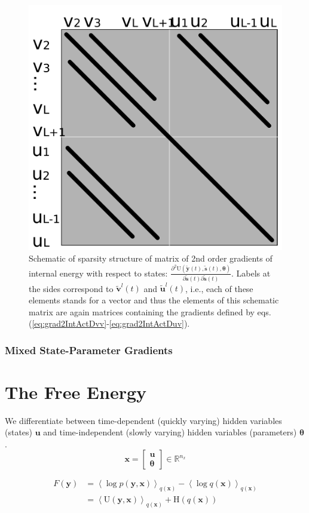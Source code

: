 \documentclass[a4paper,10pt]{article}
\newcommand{\bs}[1]{\mathbf{#1}}					%
\newcommand{\bgs}[1]{\boldsymbol{#1}}				%
\newcommand{\ppd}[3]{\frac{\partial^2 #1}{\partial #2 \partial #3}} %
\newcommand{\eq}[1]{\begin{equation} #1 \end{equation}}%
\newcommand{\gc}[1]{\tilde{#1}} %
\renewcommand{\ss}{u}         %
\newcommand{\sv}{v}         %
\newcommand{\so}{y}         %
\newcommand{\sh}{x}         %
\newcommand{\st}{s}         %
\renewcommand{\sp}{\theta}    %
\newcommand{\ps}{\bs{\ss}}    %
\newcommand{\pv}{\bs{\sv}}    %
\newcommand{\po}{\bs{\so}}    %
\newcommand{\ph}{\bs{\sh}}    %
\newcommand{\pt}{\bs{\st}}     %
\newcommand{\psg}{\gc{\ps}}    %
\newcommand{\pvg}{\gc{\pv}}    %
\newcommand{\ptg}{\gc{\pt}}     %
\newcommand{\pog}{\gc{\po}}    %
\newcommand{\pp}{\bgs{\sp}} %
\newcommand{\E}[2][]{\left\langle #2 \right\rangle_{#1}}	%
\newcommand{\Ent}{\mathrm{H}}			%
\newcommand{\U}{\mathrm{U}}			%
\newcommand{\R}{\mathbb{R}}				%
\begin{document}
\begin{figure}
    \centering
    \includegraphics[width=.5\textwidth]{stateGradientsSparseMatrix.pdf}
    \caption{Schematic of sparsity structure of matrix of 2nd order gradients of internal energy with respect to states: $\ppd{\U(\pog(t),\ptg(t),\pp)}{\ptg(t)}{\ptg(t)}$. Labels at the sides correspond to $\pvg^l(t)$ and $\psg^l(t)$, i.e., each of these elements stands for a vector and thus the elements of this schematic matrix are again matrices containing the gradients defined by eqs. (\ref{eq:grad2IntActDvv}-\ref{eq:grad2IntActDuv}).}
    \label{fig:stateGrads}
\end{figure}


\subsubsection{Mixed State-Parameter Gradients}




\section{The Free Energy}
We differentiate between time-dependent (quickly varying) hidden variables (states) $\ps$ and time-independent (slowly varying) hidden variables (parameters) $\pp$.
\eq{
    \ph = \left[\begin{array}{c}
            \ps\\
            \pp
          \end{array}\right] \in \R^{n_\sh}
}

\eq{\begin{split}
    F(\po) &= \E[q(\ph)]{\log p(\po,\ph)} - \E[q(\ph)]{\log q(\ph)}\\
               &= \E[q(\ph)]{\U(\po,\ph)} + \Ent(q(\ph))
\end{split}}
\end{document}
